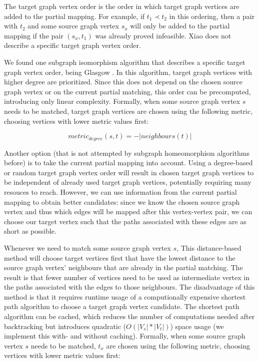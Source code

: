 The target graph vertex order is the order in which target graph vertices are added to the partial mapping. For example, if $t_1 \prec t_2$ in this ordering, then a pair with $t_2$ and some source graph vertex $s_x$ will only be added to the partial mapping if the pair $(s_x, t_1)$ was already proved infeasible. Xiao does not describe a specific target graph vertex order.

We found one subgraph isomorphism algorithm that describes a specific target graph vertex order, being Glasgow \cite{McCreesh2015}. In this algorithm, target graph vertices with higher degree are prioritized. Since this does not depend on the chosen source graph vertex or on the current partial matching, this order can be precomputed, introducing only linear complexity. Formally, when some source graph vertex $s$ needs to be matched, target graph vertices are chosen using the following metric, choosing vertices with lower metric values first:

$$\mathit{metric}_\mathit{degree}(s, t)=-|\mathit{neighbours}(t)|$$

Another option (that is not attempted by subgraph homeomorphism algorithms before) is to take the current partial mapping into account. Using a degree-based or random target graph vertex order will result in chosen target graph vertices to be independent of already used target graph vertices, potentially requiring many resouces to reach. However, we can use information from the current partial mapping to obtain better candidates: since we know the chosen source graph vertex and thus which edges will be mapped after this vertex-vertex pair, we can choose our target vertex such that the paths associated with these edges are as short as possible.

Whenever we need to match some source graph vertex $s$, This distance-based method will choose target vertices first that have the lowest distance to the source graph vertex' neighbours that are already in the partial matching. The result is that fewer number of vertices need to be used as intermediate vertex in the paths associated with the edges to those neighbours. The disadvantage of this method is that it requires runtime usage of a computionally expensive shortest path algorithm to choose a target graph vertex candidate. The shortest path algorithm can be cached, which reduces the number of computations needed after backtracking but introduces quadratic ($O(|V_s|*|V_t|)$) space usage (we implement this with- and without caching). Formally, when some source graph vertex $s$ needs to be matched, $t_x$ are chosen using the following metric, choosing vertices with lower metric values first:


